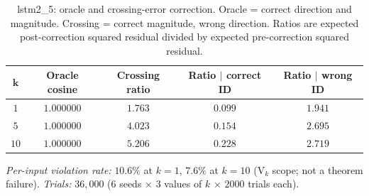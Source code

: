 \documentclass[11pt,a4paper]{article}
\begin{document}
\begin{table}[H]
\centering
\caption{lstm2\_5: oracle and crossing-error correction. Oracle = correct direction and magnitude. Crossing = correct magnitude, wrong direction. Ratios are expected post-correction squared residual divided by expected pre-correction squared residual.}
\label{tab:lstm2-5}
\renewcommand{\arraystretch}{1.25}
\vspace{4pt}
\begin{tabular}{c|cccc}
\toprule
$\bm{k}$ & \textbf{Oracle cosine} & \textbf{Crossing ratio}
         & \textbf{Ratio $\mid$ correct ID} & \textbf{Ratio $\mid$ wrong ID} \\
\midrule
$1$  & $1.000000$ & $1.763$ & $0.099$ & $1.941$ \\
$5$  & $1.000000$ & $4.023$ & $0.154$ & $2.695$ \\
$10$ & $1.000000$ & $5.206$ & $0.228$ & $2.719$ \\
\bottomrule
\end{tabular}

\vspace{4pt}
\noindent\footnotesize\emph{Per-input violation rate:} $10.6\%$ at $k = 1$, $7.6\%$ at $k = 10$ (V$_k$ scope; not a theorem failure). \emph{Trials:} $36{,}000$ ($6$ seeds $\times$ $3$ values of $k$ $\times$ $2000$ trials each).
\end{table}
\end{document}
